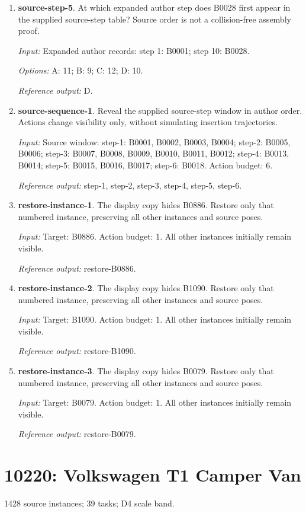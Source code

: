 \begin{enumerate}
\item \textbf{source-step-5}. At which expanded author step does B0028 first appear in the supplied source-step table? Source order is not a collision-free assembly proof.\par {\small \textit{Input:} Expanded author records: step 1: B0001; step 10: B0028. \par\textit{Options:} A: 11; B: 9; C: 12; D: 10. \par\textit{Reference output:} D.}
\item \textbf{source-sequence-1}. Reveal the supplied source-step window in author order. Actions change visibility only, without simulating insertion trajectories.\par {\small \textit{Input:} Source window: step-1: B0001, B0002, B0003, B0004; step-2: B0005, B0006; step-3: B0007, B0008, B0009, B0010, B0011, B0012; step-4: B0013, B0014; step-5: B0015, B0016, B0017; step-6: B0018. Action budget: 6. \par\textit{Reference output:} step-1, step-2, step-3, step-4, step-5, step-6.}
\item \textbf{restore-instance-1}. The display copy hides B0886. Restore only that numbered instance, preserving all other instances and source poses.\par {\small \textit{Input:} Target: B0886. Action budget: 1. All other instances initially remain visible. \par\textit{Reference output:} restore-B0886.}
\item \textbf{restore-instance-2}. The display copy hides B1090. Restore only that numbered instance, preserving all other instances and source poses.\par {\small \textit{Input:} Target: B1090. Action budget: 1. All other instances initially remain visible. \par\textit{Reference output:} restore-B1090.}
\item \textbf{restore-instance-3}. The display copy hides B0079. Restore only that numbered instance, preserving all other instances and source poses.\par {\small \textit{Input:} Target: B0079. Action budget: 1. All other instances initially remain visible. \par\textit{Reference output:} restore-B0079.}
\end{enumerate}
\clearpage
\section{10220: Volkswagen T1 Camper Van}
1428 source instances; 39 tasks; D4 scale band.

